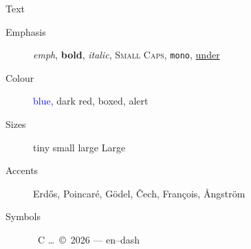 \begin{frame}{Text}
  \begin{description}
    \item[Emphasis] \emph{emph}, \textbf{bold}, \textit{italic}, \textsc{Small Caps}, \texttt{mono}, \underline{under}
    \item[Colour] \textcolor{blue}{blue}, \textcolor{red!70!black}{dark red}, \colorbox{yellow!30}{boxed}, \alert{alert}
    \item[Sizes] {\tiny tiny} {\small small} {\large large} {\Large Large}
    \item[Accents] Erd\H{o}s, Poincar\'e, G\"odel, \v{C}ech, Fran\c{c}ois, \AA ngstr\"om
    \item[Symbols] \checkmark\ \textdegree C \ldots\ \copyright\ 2026 --- en--dash
  \end{description}
\end{frame}
